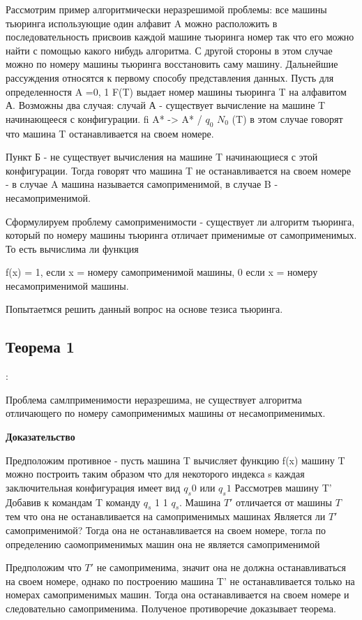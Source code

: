 Рассмотрим пример алгоритмически неразрешимой проблемы: все машины тьюринга использующие один алфавит A можно расположить в последовательность присвоив каждой машине тьюринга номер так что его можно найти с помощью какого нибудь алгоритма. С другой стороны в этом случае можно по номеру машины тьюринга восстановить саму машину. Дальнейшие рассуждения относятся к первому способу представления данных. Пусть для определенностя A ={0, 1} F(T) выдает номер машины тьюринга T на алфавитом А. Возможны два случая: случай А - существует вычисление на машине T начинающееся с конфигурации. fi A* -> A* / $q_0$ $N_0$ (T) в этом случае говорят что машина T останавливается на своем номере. 

Пункт Б - не существует вычисления на машине T начинающиеся с этой конфигурации. Тогда говорят что машина T не останавливается на своем номере - в случае A машина называется самоприменимой, в случае B - несамоприменимой.

Сформулируем проблему самоприменимости - существует ли алгоритм тьюринга, который по номеру машины тьюринга отличает применимые от самоприменимых. То есть вычислима ли функция

f(x) = 1, если x = номеру самоприменимой машины, 0 если x = номеру несамоприменимой машины.

Попытаетмся решить данный вопрос на основе тезиса тьюринга.

\subsection{Теорема 1}: 

Проблема самлприменимости неразрешима, не существует алгоритма отличающего по номеру самоприменимых машины от несамоприменимых.

\textbf{Доказательство}

Предположим противное - пусть машина T вычисляет функцию f(x) машину T можно построить таким образом что для некоторого индекса s каждая заключительная конфигурация имеет вид $q_s0$ или $q_s1$
Рассмотрев машину T' Добавив к командам T команду $q_s$ 1 1 $q_s$. Машина $T'$ отличается от машины $T$ тем что она не останавливается на самоприменимых машинах 
Является ли $T'$ самоприменимой?
Тогда она не останавливается на своем номере, тогла по определению саомоприменимых машин она не является самоприменимой


Предположим что $T'$ не самоприменима, значит она не должна останавливаться на своем номере, однако по построению машина T' не останавливается только на номерах самоприменимых машин. 
Тогда она останавливается на своем номере и следовательно самоприменима. Полученое противоречие доказывает теорема.


